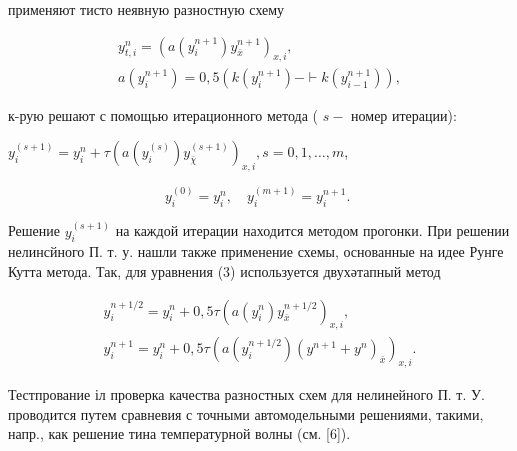 \documentclass[10pt]{article}
\begin{document}
применяют тисто неявную разностную схему



\[

\begin{gathered}

y_{t, i}^{n}=\left(a\left(y_{i}^{n+1}\right) y_{\bar{x}}^{n+1}\right)_{x, i}, \\

a\left(y_{i}^{n+1}\right)=0,5\left(k\left(y_{i}^{n+1}\right)-\vdash k\left(y_{i-1}^{n+1}\right)\right),

\end{gathered}

\]



к-рую решают с помощью итерационного метода ( $s-$ номер итерации):



$y_{i}^{(s+1)}=y_{i}^{n}+\tau\left(a\left(y_{i}^{(s)}\right) y_{\bar{\chi}}^{(s+1)}\right)_{x, i}, s=0,1, \ldots, m$,



\[

y_{i}^{(0)}=y_{i}^{n}, \quad y_{i}^{(m+1)}=y_{i}^{n+1} \text {. }

\]



Решение $y_{i}^{(s+1)}$ на каждой итерации находится методом прогонки. При решении нелинсйного П. т. у. нашли также применение схемы, основанные на идее Рунге Кутта метода. Так, для уравнения (3) используется двухәтапный метод



\[

\begin{gathered}

y_{i}^{n+1 / 2}=y_{i}^{n}+0,5 \tau\left(a\left(y_{i}^{n}\right) y_{\bar{x}}^{n+1 / 2}\right)_{x, i}, \\

y_{i}^{n+1}=y_{i}^{n}+0,5 \tau\left(a\left(y_{i}^{n+1 / 2}\right)\left(y^{n+1}+y^{n}\right)_{\bar{x}}\right)_{x, i} .

\end{gathered}

\]



Тестпрование іл проверка качества разностных схем для нелинейного П. т. У. проводится путем сравневия с точными автомодельными решениями, такими, напр., как решение тина температурной волны (см. [6]).
\end{document}
